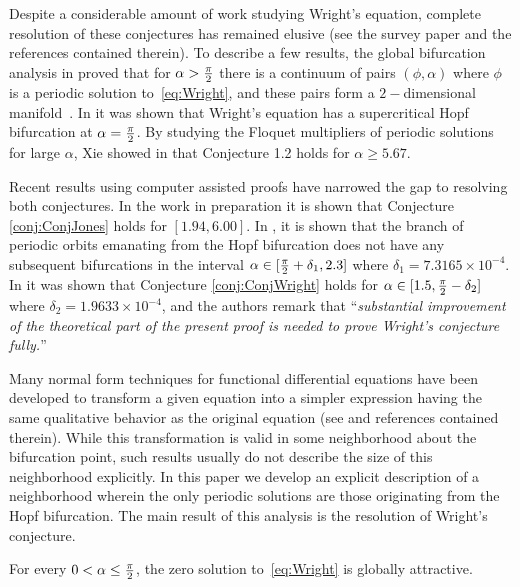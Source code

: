 Despite a considerable amount of work studying Wright's equation, complete resolution of these conjectures has remained elusive (see the survey paper \cite{walther2014topics} and the references contained therein). 
To describe a few  results,
the global bifurcation analysis in \cite{nussbaum1975global} proved that for $ \alpha > \tfrac{\pi}{2}$ there is a continuum of pairs $(\phi,\alpha)$ where $ \phi$ is a periodic solution to~\eqref{eq:Wright}, and these pairs form a $2-$dimensional manifold~\cite{regala1989periodic}.
In \cite{chow1977integral} it was shown that Wright's equation has a supercritical Hopf bifurcation at $ \alpha = \tfrac{\pi}{2}$. 
By studying the Floquet multipliers of periodic solutions for large $ \alpha$, Xie showed in  \cite{xie1991thesis} that Conjecture 1.2 holds for $ \alpha \geq 5.67$.  




Recent results using computer assisted proofs have narrowed the gap to resolving both conjectures. 
In the work in preparation \cite{jlm2016Floquet} it is shown that Conjecture \ref{conj:ConjJones} holds for $ [1.94,6.00]$. 
In \cite{lessard2010recent}, it is shown that the branch of periodic orbits emanating from the Hopf bifurcation does not have any subsequent bifurcations in the interval $ \alpha \in  [ \tfrac{\pi}{2} + \delta_1 , 2.3]$ where $ \delta_1 = 7.3165 \times 10^{-4}$.  
In \cite{neumaier2014global} it was shown that Conjecture \ref{conj:ConjWright} holds for $ \alpha \in [1.5, \tfrac{\pi}{2} - \delta_2 ]$ where $ \delta_2 = 1.9633 \times 10^{-4}$, and the authors remark that ``\emph{substantial improvement of the theoretical
	part of the present proof is needed to prove Wright's conjecture fully.}''





Many normal form techniques for functional differential equations have been developed  to transform a given equation into a simpler expression having the same qualitative behavior as the original equation (see \cite{faria2006normal} and references contained therein). 
While this transformation is valid in some neighborhood about the bifurcation point, such results usually do not describe the size of this neighborhood explicitly. 
In this paper we develop an explicit description of a neighborhood wherein the only periodic solutions are those originating from the Hopf bifurcation. 
The main result of this analysis is the resolution of Wright's conjecture. 

\begin{theorem}
	For every $0 < \alpha \leq \tfrac{\pi}{2}  $, the zero solution to~\eqref{eq:Wright} is globally attractive.
	\label{thm:IntroWrightConjecture} 
\end{theorem}

